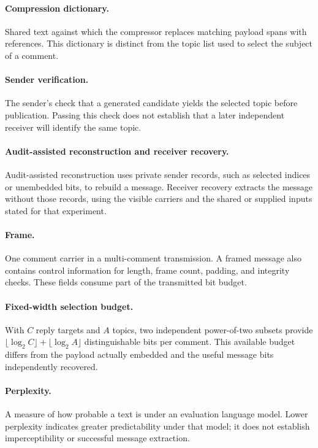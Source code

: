 \paragraph{Compression dictionary.}
Shared text against which the compressor replaces matching payload spans with references. This dictionary is distinct from the topic list used to select the subject of a comment.

\paragraph{Sender verification.}
The sender's check that a generated candidate yields the selected topic before publication. Passing this check does not establish that a later independent receiver will identify the same topic.

\paragraph{Audit-assisted reconstruction and receiver recovery.}
Audit-assisted reconstruction uses private sender records, such as selected indices or unembedded bits, to rebuild a message. Receiver recovery extracts the message without those records, using the visible carriers and the shared or supplied inputs stated for that experiment.

\paragraph{Frame.}
One comment carrier in a multi-comment transmission. A framed message also contains control information for length, frame count, padding, and integrity checks. These fields consume part of the transmitted bit budget.

\paragraph{Fixed-width selection budget.}
With $C$ reply targets and $A$ topics, two independent power-of-two subsets provide $\lfloor\log_2 C\rfloor+\lfloor\log_2 A\rfloor$ distinguishable bits per comment. This available budget differs from the payload actually embedded and the useful message bits independently recovered.

\paragraph{Perplexity.}
A measure of how probable a text is under an evaluation language model. Lower perplexity indicates greater predictability under that model; it does not establish imperceptibility or successful message extraction.
